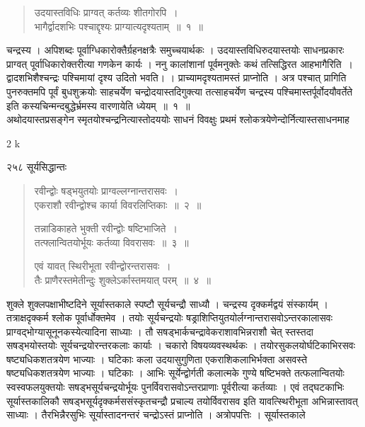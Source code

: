 \documentclass[11pt, openany]{book}
\begin{document}
 \begin{quote}
{\ssi उदयास्तविधिः प्राग्वत् कर्तव्यः शीतगोरपि~। \\ 
भागैर्द्वादशभिः पश्चाद्दृश्यः प्राग्यात्यदृश्यताम्~॥~१~॥}
\end{quote}
 चन्द्रस्य । अपिशब्दः पूर्वाग्धिकारोक्तैर्ग्रहनक्षत्रैः समुच्चयार्थकः । उदयास्तविधिरुदयास्तयोः साधनप्रकारः प्राग्वत् पूर्वाधिकारोक्तरीत्या गणकेन कार्यः । ननु कालांशानां पूर्वमनुक्तेः कथं तत्सिद्धिरत आह\textendash भागैरिति~। द्वादशभिशैश्चन्द्रः पश्चिमायां दृश्य उदितो भवति। । प्राच्यामदृश्यतामस्तं प्राप्नोति । अत्र पश्चात् प्रागिति पुनरुक्तमपि पूर्वं बुधशुक्रयोः साहचर्येण चन्द्रोदयास्तदिगुक्त्या तत्साहचर्येण चन्द्रस्य पश्चिमास्तर्पूर्वोदयौवर्तेते इति कस्यचिन्मन्दबुद्धेर्भ्रमस्य वारणायेति ध्येयम्~॥~१~॥\\
\noindent अथोदयास्तप्रसङ्गेन स्मृतयोश्चन्द्रनित्यास्तोदययोः साधनं विवक्षुः प्रथमं श्लोकत्रयेणेन्दोर्नित्यास्तसाधनमाह \textendash


{\tiny{2 k}}

\newpage

\noindent २५८ \hspace{4cm} सूर्यसिद्धान्तः 

 \begin{quote}
{\ssi  रवीन्द्वोः षड्भयुतयोः प्राग्वल्लग्नान्तरासवः~।\\
 एकराशौ रवीन्द्वोश्च कार्या विवरलिप्तिकाः~॥~२~॥

तन्नाडिकाहते भुक्ती रवीन्द्वोः षष्टिभाजिते~।\\
तत्फ्लान्वितयोर्भूयः कर्तव्या विवरासवः~॥~३~॥

एवं यावत् स्थिरीभूता रवीन्द्वोरन्तरासवः~।\\
तैः प्राणैरस्तमेतीन्दुः शुक्लेऽर्कास्तमयात् परम्~॥~४~॥ }
\end{quote}

 शुक्ले शुक्लपक्षाभीष्टदिने सूर्यास्तकाले स्पष्टौ सूर्यचन्द्रौ साध्यौ । चन्द्रस्य दृक्कर्मद्वयं संस्कार्यम् । तत्राक्षदृक्कर्म श्लोक पूर्वार्धोक्तमेव । तयोः सूर्यचन्द्रयोः षड्राशिप्तियुतयोर्लग्नान्तरासवोऽन्तरकालासवः प्राग्वद्भोग्यासूनूनकस्येत्यादिना साध्याः । तौ सषड्भार्कचन्द्रावेकराशावभिन्नराशौ चेत् स्तस्तदा सषड्भयोस्तयोः सूर्यचन्द्रयोरन्तरकलाः कार्याः । चकारो विषयव्यवस्थर्थकः । तयोरसुकलयोर्घटिकाभिरसवः षष्ट्यधिकशतत्रयेण भाज्याः । घटिकाः कला उदयासुगुणिता एकराशिकलाभिर्भक्ता असवस्ते षष्ट्यधिकशतत्रयेण भाज्याः । घटिकाः । आभिः सूर्येन्द्वोर्गती कलात्मके गुण्ये षष्टिभक्ते तत्फलान्वितयोः स्वस्वफलयुक्तयोः सषड्भसूर्यचन्द्रयोर्भूयः पुनर्विवरासवोऽन्तरप्राणाः पूर्वरीत्या कर्तव्याः । एवं तद्घटकाभिः सूर्यास्तकालिकौ सषड्भसूर्यदृक्कर्मससंस्कृतचन्द्रौ प्रचाल्य तयोर्विवरासव इति यावत्स्थिरीभूता अभिन्नास्तावत् साध्याः । तैरभिन्नैरसुभिः सूर्यास्तादनन्तरं चन्द्रोऽस्तं प्राप्नोति । अत्रोपपत्तिः । सूर्यास्तकाले \textendash
\end{document}
